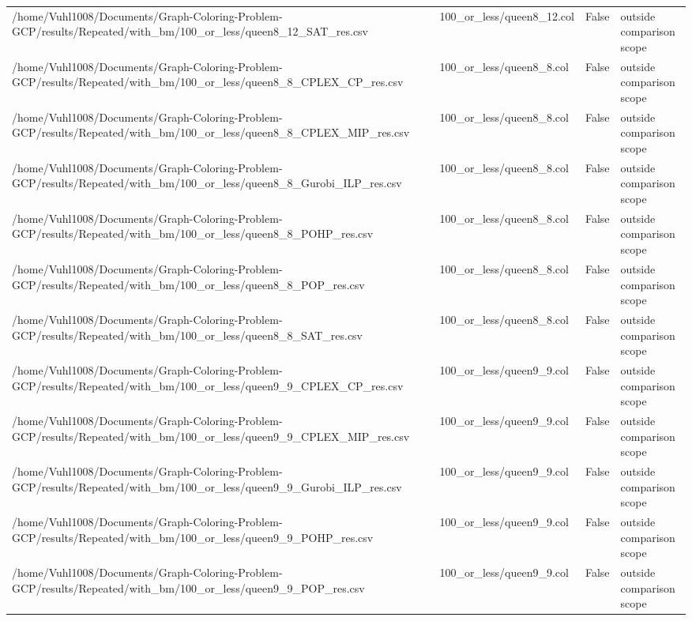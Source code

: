 \begin{table}[htbp]
\begin{tabular}{llll}
/home/Vuhl1008/Documents/Graph-Coloring-Problem-GCP/results/Repeated/with\_bm/100\_or\_less/queen8\_12\_SAT\_res.csv & 100\_or\_less/queen8\_12.col & False & outside comparison scope \\
/home/Vuhl1008/Documents/Graph-Coloring-Problem-GCP/results/Repeated/with\_bm/100\_or\_less/queen8\_8\_CPLEX\_CP\_res.csv & 100\_or\_less/queen8\_8.col & False & outside comparison scope \\
/home/Vuhl1008/Documents/Graph-Coloring-Problem-GCP/results/Repeated/with\_bm/100\_or\_less/queen8\_8\_CPLEX\_MIP\_res.csv & 100\_or\_less/queen8\_8.col & False & outside comparison scope \\
/home/Vuhl1008/Documents/Graph-Coloring-Problem-GCP/results/Repeated/with\_bm/100\_or\_less/queen8\_8\_Gurobi\_ILP\_res.csv & 100\_or\_less/queen8\_8.col & False & outside comparison scope \\
/home/Vuhl1008/Documents/Graph-Coloring-Problem-GCP/results/Repeated/with\_bm/100\_or\_less/queen8\_8\_POHP\_res.csv & 100\_or\_less/queen8\_8.col & False & outside comparison scope \\
/home/Vuhl1008/Documents/Graph-Coloring-Problem-GCP/results/Repeated/with\_bm/100\_or\_less/queen8\_8\_POP\_res.csv & 100\_or\_less/queen8\_8.col & False & outside comparison scope \\
/home/Vuhl1008/Documents/Graph-Coloring-Problem-GCP/results/Repeated/with\_bm/100\_or\_less/queen8\_8\_SAT\_res.csv & 100\_or\_less/queen8\_8.col & False & outside comparison scope \\
/home/Vuhl1008/Documents/Graph-Coloring-Problem-GCP/results/Repeated/with\_bm/100\_or\_less/queen9\_9\_CPLEX\_CP\_res.csv & 100\_or\_less/queen9\_9.col & False & outside comparison scope \\
/home/Vuhl1008/Documents/Graph-Coloring-Problem-GCP/results/Repeated/with\_bm/100\_or\_less/queen9\_9\_CPLEX\_MIP\_res.csv & 100\_or\_less/queen9\_9.col & False & outside comparison scope \\
/home/Vuhl1008/Documents/Graph-Coloring-Problem-GCP/results/Repeated/with\_bm/100\_or\_less/queen9\_9\_Gurobi\_ILP\_res.csv & 100\_or\_less/queen9\_9.col & False & outside comparison scope \\
/home/Vuhl1008/Documents/Graph-Coloring-Problem-GCP/results/Repeated/with\_bm/100\_or\_less/queen9\_9\_POHP\_res.csv & 100\_or\_less/queen9\_9.col & False & outside comparison scope \\
/home/Vuhl1008/Documents/Graph-Coloring-Problem-GCP/results/Repeated/with\_bm/100\_or\_less/queen9\_9\_POP\_res.csv & 100\_or\_less/queen9\_9.col & False & outside comparison scope \\

\end{tabular}
\end{table}
